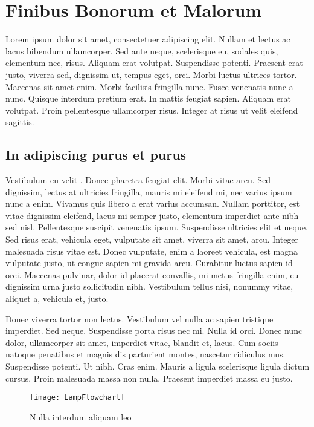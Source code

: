 \chapter{Finibus Bonorum et Malorum}

Lorem ipsum dolor sit amet, consectetuer adipiscing elit. Nullam et lectus ac lacus bibendum ullamcorper. Sed ante neque, scelerisque eu, sodales quis, elementum nec, risus. Aliquam erat volutpat. Suspendisse potenti. Praesent erat justo, viverra sed, dignissim ut, tempus eget, orci. Morbi luctus ultrices tortor. Maecenas sit amet enim. Morbi facilisis fringilla nunc. Fusce venenatis nunc a nunc. Quisque interdum pretium erat. In mattis feugiat sapien. Aliquam erat volutpat. Proin pellentesque ullamcorper risus. Integer at risus ut velit eleifend sagittis.

\section{In adipiscing purus et purus}

Vestibulum eu velit \cite{han99}. Donec pharetra feugiat elit. Morbi vitae arcu. Sed dignissim, lectus at ultricies fringilla, mauris mi eleifend mi, nec varius ipsum nunc a enim. Vivamus quis libero a erat varius accumsan. Nullam porttitor, est vitae dignissim eleifend, lacus mi semper justo, elementum imperdiet ante nibh sed nisl. Pellentesque suscipit venenatis ipsum. Suspendisse ultricies elit et neque. Sed risus erat, vehicula eget, vulputate sit amet, viverra sit amet, arcu. Integer malesuada risus vitae est. Donec vulputate, enim a laoreet vehicula, est magna vulputate justo, ut congue sapien mi gravida arcu. Curabitur luctus sapien id orci. Maecenas pulvinar, dolor id placerat convallis, mi metus fringilla enim, eu dignissim urna justo sollicitudin nibh. Vestibulum tellus nisi, nonummy vitae, aliquet a, vehicula et, justo.

Donec viverra tortor non lectus. Vestibulum vel nulla ac sapien tristique imperdiet. Sed neque. Suspendisse porta risus nec mi. Nulla id orci. Donec nunc dolor, ullamcorper sit amet, imperdiet vitae, blandit et, lacus. Cum sociis natoque penatibus et magnis dis parturient montes, nascetur ridiculus mus. Suspendisse potenti. Ut nibh. Cras enim. Mauris a ligula scelerisque ligula dictum cursus. Proin malesuada massa non nulla. Praesent imperdiet massa eu justo.

\begin{figure}[htb]
  \centering
  \texttt{[image: LampFlowchart]}\\ %
  \caption{Nulla interdum aliquam leo}\label{fig:LampFlowchart}
\end{figure}


